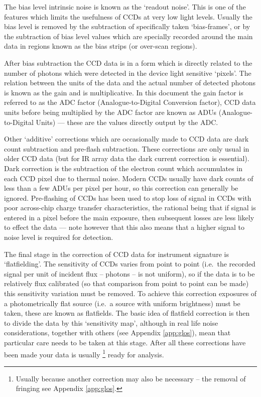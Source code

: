 The bias level intrinsic noise is known as the `readout noise'. This is
one of the features which limits the usefulness of CCDs at very low
light levels. Usually the bias level is removed by the subtraction of
specifically taken `bias-frames', or by the subtraction of bias level
values which are specially recorded around the main data in regions
known as the bias strips (or over-scan regions).

After bias subtraction the CCD data is in a form which is directly
related to the number of photons which were detected in the device light
sensitive `pixels'. The relation between the units of the data and the
actual number of detected photons is known as the gain and is
multiplicative. In this document the gain factor is referred to as the
ADC factor (Analogue-to-Digital Conversion factor), CCD data units
before being multiplied by the ADC factor are known as ADUs
(Analogue-to-Digital Units) --- these are the values directly output by
the ADC.

Other `additive' corrections which are occasionally made to CCD data are
dark count subtraction and pre-flash subtraction. These corrections are
only usual in older CCD data (but for IR array data the dark current
correction is essential). Dark correction is the subtraction of the
electron count which accumulates in each CCD pixel due to thermal noise.
Modern CCDs usually have dark counts of less than a few ADUs per pixel
per hour, so this correction can generally be ignored. Pre-flashing of
CCDs has been used to stop loss of signal in CCDs with poor across-chip
charge transfer characteristics, the rational being that if signal is
entered in a pixel before the main exposure, then subsequent losses are
less likely to effect the data --- note however that this also means
that a higher signal to noise level is required for detection.


The final stage in the correction of CCD data for instrument signature
is `flatfielding'. The sensitivity of CCDs varies from point to point
(i.e.\ the recorded signal per unit of incident flux -- photons -- is not
uniform), so if the data is to be relatively flux calibrated (so that
comparison from point to point can be made) this sensitivity variation
must be removed. To achieve this correction exposures of a
photometrically flat source (i.e.\ a source with uniform brightness)
must be taken, these are known as flatfields. The basic idea of
flatfield correction is then to divide the data by this `sensitivity
map', although in real life noise considerations, together with others
(see Appendix \ref{app:glos}), mean that particular care needs to be
taken at this stage. After all these corrections have been made your
data is usually \footnote{ Usually because another correction may also
be necessary -- the removal of fringing see Appendix \ref{app:glos}.}
ready for analysis. 


